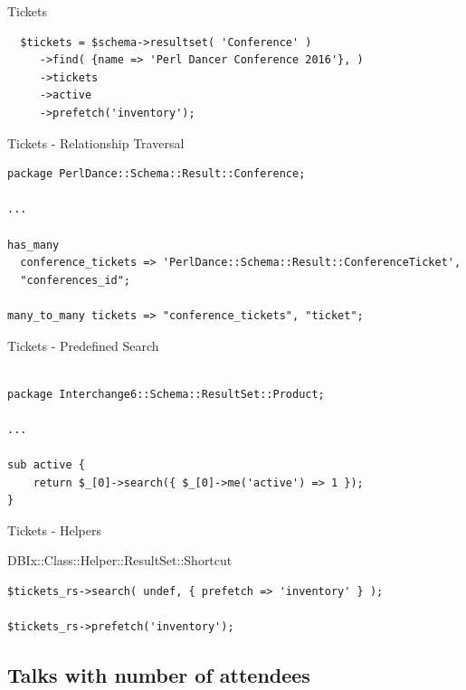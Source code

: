 \begin{frame}[fragile]{Tickets}

\begin{lstlisting}
  $tickets = $schema->resultset( 'Conference' )
     ->find( {name => 'Perl Dancer Conference 2016'}, )
     ->tickets
     ->active
     ->prefetch('inventory');
\end{lstlisting}
\end{frame}

\begin{frame}[fragile]{Tickets - Relationship Traversal}
\begin{lstlisting}
package PerlDance::Schema::Result::Conference;

...

has_many
  conference_tickets => 'PerlDance::Schema::Result::ConferenceTicket',
  "conferences_id";

many_to_many tickets => "conference_tickets", "ticket";

\end{lstlisting}
\end{frame}

\begin{frame}[fragile]{Tickets - Predefined Search}
\begin{lstlisting}

package Interchange6::Schema::ResultSet::Product;

...

sub active {
    return $_[0]->search({ $_[0]->me('active') => 1 });
}

\end{lstlisting}
\end{frame}

\begin{frame}[fragile]{Tickets - Helpers}

DBIx::Class::Helper::ResultSet::Shortcut

\begin{lstlisting}
$tickets_rs->search( undef, { prefetch => 'inventory' } );

$tickets_rs->prefetch('inventory');
\end{lstlisting}
\end{frame}

\subsection{Talks with number of attendees}

